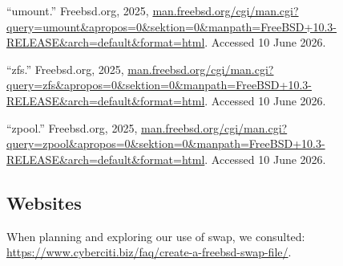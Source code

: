 “umount.” Freebsd.org, 2025, \url{man.freebsd.org/cgi/man.cgi?query=umount&apropos=0&sektion=0&manpath=FreeBSD+10.3-RELEASE&arch=default&format=html}. Accessed 10 June 2026.

“zfs.” Freebsd.org, 2025, \url{man.freebsd.org/cgi/man.cgi?query=zfs&apropos=0&sektion=0&manpath=FreeBSD+10.3-RELEASE&arch=default&format=html}. Accessed 10 June 2026.

“zpool.” Freebsd.org, 2025, \url{man.freebsd.org/cgi/man.cgi?query=zpool&apropos=0&sektion=0&manpath=FreeBSD+10.3-RELEASE&arch=default&format=html}. Accessed 10 June 2026.
\subsection{Websites}
When planning and exploring our use of swap, we consulted:  \url{https://www.cyberciti.biz/faq/create-a-freebsd-swap-file/}. \\

\markchapterendnotes
